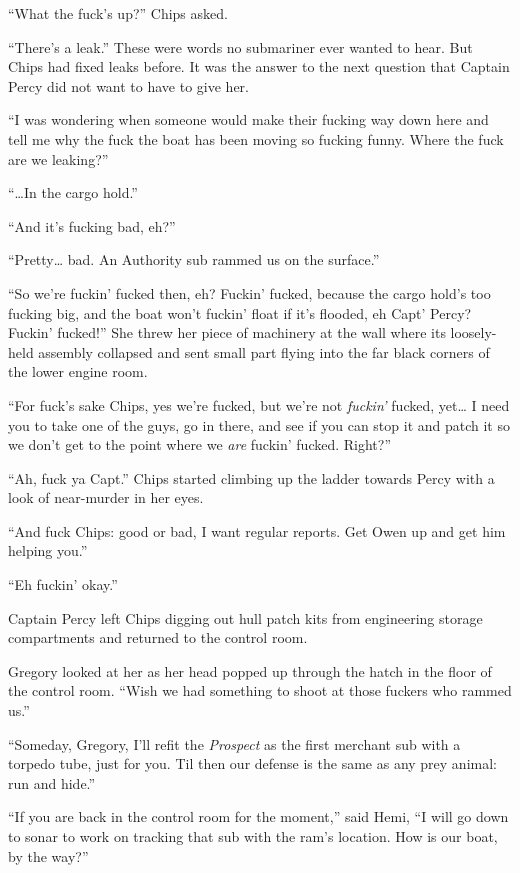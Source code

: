 \documentclass[]{scrbook}
\begin{document}
``What the fuck's up?'' Chips asked.

``There's a leak.'' These were words no submariner ever wanted to hear.
But Chips had fixed leaks before. It was the answer to the next question
that Captain Percy did not want to have to give her.

``I was wondering when someone would make their fucking way down here
and tell me why the fuck the boat has been moving so fucking funny.
Where the fuck are we leaking?''

``\ldots{}In the cargo hold.''

``And it's fucking bad, eh?''

``Pretty\ldots{} bad. An Authority sub rammed us on the surface.''

``So we're fuckin' fucked then, eh? Fuckin' fucked, because the cargo
hold's too fucking big, and the boat won't fuckin' float if it's
flooded, eh Capt' Percy? Fuckin' fucked!'' She threw her piece of
machinery at the wall where its loosely-held assembly collapsed and sent
small part flying into the far black corners of the lower engine room.

``For fuck's sake Chips, yes we're fucked, but we're not \emph{fuckin'}
fucked, yet\ldots{} I need you to take one of the guys, go in there, and
see if you can stop it and patch it so we don't get to the point where
we \emph{are} fuckin' fucked. Right?''

``Ah, fuck ya Capt.'' Chips started climbing up the ladder towards Percy
with a look of near-murder in her eyes.

``And fuck Chips: good or bad, I want regular reports. Get Owen up and
get him helping you.''

``Eh fuckin' okay.''

Captain Percy left Chips digging out hull patch kits from engineering
storage compartments and returned to the control room.

Gregory looked at her as her head popped up through the hatch in the
floor of the control room. ``Wish we had something to shoot at those
fuckers who rammed us.''

``Someday, Gregory, I'll refit the \emph{Prospect} as the first merchant
sub with a torpedo tube, just for you. Til then our defense is the same
as any prey animal: run and hide.''

``If you are back in the control room for the moment,'' said Hemi, ``I
will go down to sonar to work on tracking that sub with the ram's
location. How is our boat, by the way?''
\end{document}
